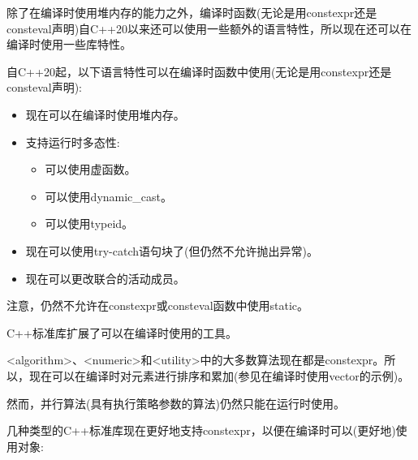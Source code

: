 
除了在编译时使用堆内存的能力之外，编译时函数(无论是用constexpr还是consteval声明)自C++20以来还可以使用一些额外的语言特性，所以现在还可以在编译时使用一些库特性。


自C++20起，以下语言特性可以在编译时函数中使用(无论是用constexpr还是consteval声明):

\begin{itemize}
\item
现在可以在编译时使用堆内存。

\item
支持运行时多态性:

\begin{itemize}
\item
可以使用虚函数。

\item
可以使用dynamic\_cast。

\item
可以使用typeid。
\end{itemize}

\item
现在可以使用try-catch语句块了(但仍然不允许抛出异常)。

\item
现在可以更改联合的活动成员。
\end{itemize}

注意，仍然不允许在constexpr或consteval函数中使用static。


C++标准库扩展了可以在编译时使用的工具。


<algorithm>、<numeric>和<utility>中的大多数算法现在都是constexpr。所以，现在可以在编译时对元素进行排序和累加(参见在编译时使用vector的示例)。

然而，并行算法(具有执行策略参数的算法)仍然只能在运行时使用。


几种类型的C++标准库现在更好地支持constexpr，以便在编译时可以(更好地)使用对象:


